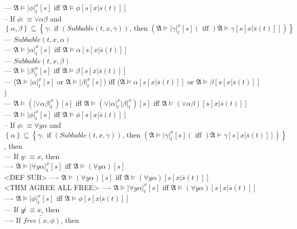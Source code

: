 \documentclass{book}
\newcommand{\is}{:\equiv}
\newcommand{\pnot}[1]{\widetilde{#1}}
\newcommand{\inot}{\not}
\newcommand{\txtiff}{\left(\text{ iff }\right)}
\newcommand{\txtif}[2]{\text{ if }\left(#1\right)\text{, then }\left(#2\right)}
\newcommand{\free}[2]{free(#1, #2)}
\newcommand{\extend}[1]{\overline{#1}}
\newcommand{\set}[1]{\left\{ #1 \right\}}
\newcommand{\sub}[3]{\left|#1\right|_{#3}^{#2}}
\begin{document}
			--- $\mathfrak{A} \vDash \sub{\phi}{x}{t}[s]$ iff $\mathfrak{A} \vDash \phi[s[x|\extend{s}(t)]]$ \\
		-- If $\phi \is \lor \alpha \beta$ and $\set{\alpha, \beta} \subseteq \set{\gamma: \txtif{Subbable(t, x, \gamma)}{\mathfrak{A} \vDash \sub{\gamma}{x}{t}[s] \txtiff \mathfrak{A} \vDash \gamma[s[x|\extend{s}(t)]]}}$ \\
			--- $Subbable(t, x, \alpha)$ \\
			--- $\mathfrak{A} \vDash \sub{\alpha}{x}{t}[s]$ iff $\mathfrak{A} \vDash \alpha[s[x|\extend{s}(t)]]$ \\
			--- $Subbable(t, x, \beta)$ \\
			--- $\mathfrak{A} \vDash \sub{\beta}{x}{t}[s]$ iff $\mathfrak{A} \vDash \beta[s[x|\extend{s}(t)]]$ \\
			--- ($\mathfrak{A} \vDash \sub{\alpha}{x}{t}[s]$ or $\mathfrak{A} \vDash \sub{\beta}{x}{t}[s]$) iff ($\mathfrak{A} \vDash \alpha[s[x|\extend{s}(t)]]$ or $\mathfrak{A} \vDash \beta[s[x|\extend{s}(t)]]$) \\
			--- $\mathfrak{A} \vDash (\sub{\lor \alpha \beta}{x}{t})[s]$ iff $\mathfrak{A} \vDash (\lor \sub{\alpha}{x}{t} \sub{\beta}{x}{t})[s]$ iff $\mathfrak{A} \vDash (\lor \alpha \beta)[s[x|\extend{s}(t)]]$ \\
			--- $\mathfrak{A} \vDash \sub{\phi}{x}{t}[s]$ iff $\mathfrak{A} \vDash \phi[s[x|\extend{s}(t)]]$ \\
		-- If $\phi \is \forall y \alpha$ and $\set{\alpha} \subseteq \set{\gamma: \txtif{Subbable(t, x, \gamma)}{\mathfrak{A} \vDash \sub{\gamma}{x}{t}[s] \txtiff \mathfrak{A} \vDash \gamma[s[x|\extend{s}(t)]]}}$, then \\
			--- If $y \is x$, then \\
				---- $\mathfrak{A} \vDash \sub{\forall y \alpha}{x}{t}[s]$ iff $\mathfrak{A} \vDash (\forall y \alpha)[s]$ \\ <DEF SUB>
				---- $\mathfrak{A} \vDash (\forall y \alpha)[s]$ iff $\mathfrak{A} \vDash (\forall y \alpha)[s[x|\extend{s}(t)]]$ \\ <THM AGREE ALL FREE>
				---- $\mathfrak{A} \vDash \sub{\forall y \alpha}{x}{t}[s]$ iff $\mathfrak{A} \vDash (\forall y \alpha)[s[x|\extend{s}(t)]]$ \\
				---- $\mathfrak{A} \vDash \sub{\phi}{x}{t}[s]$ iff $\mathfrak{A} \vDash \phi[s[x|\extend{s}(t)]]$ \\
			--- If $y \inot \is x$, then \\
				---- If $\pnot{\free{x}{\phi}}$, then \\
\end{document}

